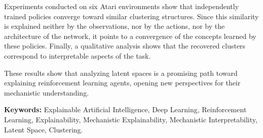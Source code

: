 Experiments conducted on six Atari environments show that independently trained policies converge toward similar clustering structures.
Since this similarity is explained neither by the observations, nor by the actions, nor by the architecture of the network, it points to a convergence of the concepts learned by these policies.
Finally, a qualitative analysis shows that the recovered clusters correspond to interpretable aspects of the task.

These results show that analyzing latent spaces is a promising path toward explaining reinforcement learning agents, opening new perspectives for their mechanistic understanding.

\bigskip
\noindent\textbf{Keywords:} Explainable Artificial Intelligence, Deep Learning, Reinforcement Learning, Explainability, Mechanistic Explainability, Mechanistic Interpretability, Latent Space, Clustering.

